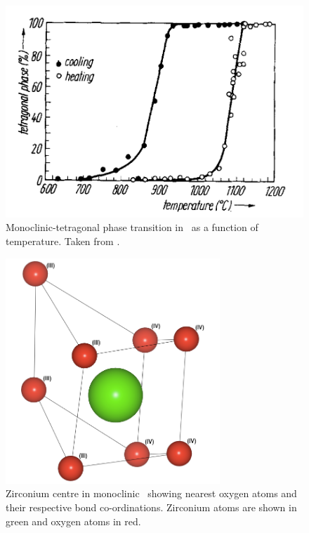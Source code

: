 \begin{figure}[htp] %
\centering
\includegraphics[width=12cm]{images/hysteresis_monotet.png}
\caption[Monoclinic-tetragonal phase transition in \zirconia\ as a function of temperature.]{Monoclinic-tetragonal phase transition in \zirconia\ as a function of temperature. Taken from \cite{WOLTEN1963}.}
\label{figure:hysteresis_monotet}
\end{figure}

\begin{figure}[htp] %
\centering
\includegraphics[height=8.5cm]{images/zr_centre_mono.png}
\caption{Zirconium centre in monoclinic \zirconia\ showing nearest oxygen atoms and their respective bond co-ordinations. Zirconium atoms are shown in green and oxygen atoms in red.}
\label{figure:monoschottky}
\end{figure}


